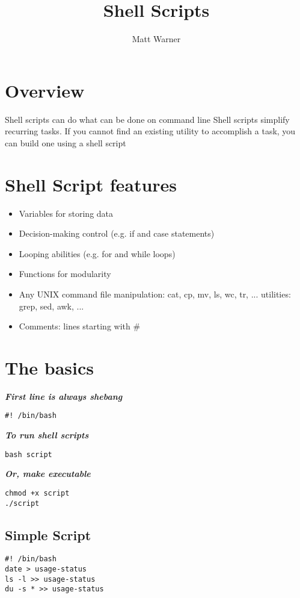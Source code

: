 \documentclass{report}
\title{\Huge{Shell Scripts}}
\author{\huge{Matt Warner}}
\date{\huge{}}
\begin{document}
  \maketitle
\tableofcontents
\newpage
  \section{Overview}
Shell scripts can do what can be done on command line
\bigbreak \noindent
Shell scripts simplify recurring tasks. If you cannot find an existing utility to accomplish a task, you can build one using a shell script
\section{Shell Script features}
\begin{itemize}
  \item Variables for storing data 
\item Decision-making control (e.g. if and case statements)
\item Looping abilities (e.g. for and while loops)
\item Functions for modularity
\item Any UNIX command
  \subitem file manipulation: cat, cp, mv, ls, wc, tr, ...
  \subitem utilities: grep, sed, awk, ...
\item Comments: lines starting with \#
\end{itemize}
\section{The basics}
\textit{\textbf{First line is always shebang}}
\begin{verbatim}
#! /bin/bash
\end{verbatim}
\textit{\textbf{To run shell scripts}}
\begin{verbatim}
bash script
\end{verbatim}
\textit{\textbf{Or, make executable}}
\begin{verbatim}
chmod +x script
./script
\end{verbatim}
\subsection{Simple Script}
\begin{mdframed}
  \begin{verbatim}
#! /bin/bash
date > usage-status
ls -l >> usage-status
du -s * >> usage-status
\end{verbatim}
\end{mdframed}
\end{document}
